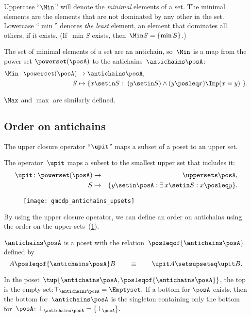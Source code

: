 
Uppercase ``$\Min$'' will denote the \emph{minimal} elements of a set.
The minimal elements are the elements that are not dominated by any other in the set.
Lowercase ``$\min$'' denotes\emph{ the least} element, an element that dominates all others, if it exists.
(If~$\min S$ exists, then~$\Min S=\{\min S\}$.)

The set of minimal elements of a set are an antichain, so~$\Min$
is a map from the power set $\powerset(\posA)$ to the antichains~$\antichains\posA$:
\begin{align*}
    \Min\colon\powerset(\posA) & \rightarrow\antichains\posA, \\
    S                          & \mapsto\{x\setin S:\ (y\setin S)\wedge(y\posleq x)\Imp(x=y)\ \}.
\end{align*}

$\Max$ and $\max$ are similarly defined.

\subsection{Order on antichains}

The upper closure operator ``$\upit$'' maps a subset of a poset to an upper set.
\begin{definition}
    The operator~$\upit$ maps a subset to the smallest upper set that includes it:
    \begin{eqnarray*}
        \upit\colon\powerset(\posA) & \rightarrow & \uppersets\posA,\\
        S & \mapsto & \{y\setin\posA:\exists\,x\setin S:x\posleq y\}.
    \end{eqnarray*}
\end{definition}

\begin{figure}[h]
    \centering
    \texttt{[image: gmcdp\_antichains\_upsets]}
    \caption{}
    \label{fig:antichains_upsets}
\end{figure}

By using the upper closure operator, we can define an order on antichains using the order on the upper sets~(\cref{fig:antichains_upsets}).
\begin{lemma}
    \label{lem:antichains-are-poset}$\antichains\posA$ is a poset with the relation~$\posleqof{\antichains\posA}$ defined by
    \[
        A\posleqof{\antichains\posA}
        B\qquad\equiv\qquad\upit A\setsupseteq\upit B.
    \]
\end{lemma}
In the poset $\tup{\antichains\posA,\posleqof{\antichains\posA}}$, the top is the empty set:$\top_{\antichains\posA}=\Emptyset.$
If a bottom for $\posA$ exists, then the bottom for~$\antichains\posA$
is the singleton containing only the bottom for~$\posA$: $\bot_{\antichains\posA}=\{\bot_{\posA}\}.$


